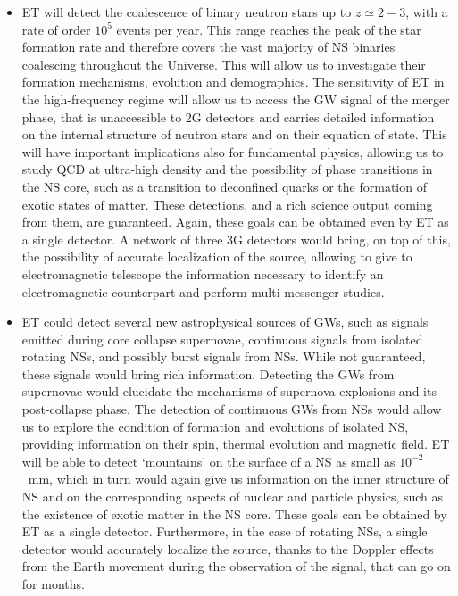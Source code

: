 \begin{itemize}
\vspace{1mm}

\item ET will detect the coalescence of binary neutron stars up to $z\simeq 2-3$, with a rate of order $10^5$ events per year. This range  reaches the peak of the star formation rate and therefore covers the vast majority of NS binaries  coalescing throughout the Universe. This will allow us to investigate their formation mechanisms, evolution and demographics. The sensitivity of ET in the high-frequency regime will allow us to access the GW signal of the merger phase, that is unaccessible to 2G detectors and carries detailed information on the internal structure of neutron stars and on their equation of state. This will have  important implications also for fundamental physics, allowing us to study QCD at ultra-high density and  the possibility of phase transitions in the NS core, such as a transition to deconfined quarks or the formation of exotic states of matter. These detections, and a rich science output coming from them,  are guaranteed. Again, these goals can be obtained even by ET as a single detector. A network of three 3G detectors would bring, on top of this, the possibility of accurate localization of the source, allowing to give to electromagnetic telescope the information necessary to identify an electromagnetic counterpart and perform multi-messenger studies.

\vspace{1mm}

\item ET  could detect several new astrophysical sources of GWs, such as signals emitted during core collapse supernovae, continuous signals from isolated rotating NSs, and possibly burst signals from NSs. While not guaranteed, these signals would bring rich information. Detecting  the GWs from supernovae would
elucidate the mechanisms of supernova explosions and its post-collapse phase.
The detection of continuous GWs from NSs  would   allow us to explore the condition of formation and evolutions  of isolated NS, providing information on  their spin, thermal evolution and magnetic field.  ET will be able to detect `mountains' on the surface of a NS as small as $10^{-2}$~mm,   which in turn would again give us  information on the inner structure of NS and on the corresponding aspects of nuclear and particle physics, such as the existence of exotic matter in the NS core. These goals can be obtained by ET as a single detector. Furthermore, in the case of rotating NSs, a single detector would accurately localize the source, thanks to the Doppler effects from the Earth movement during the observation of the signal, that can go on for months.


\end{itemize}
